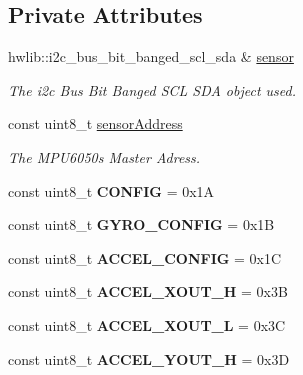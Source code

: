 \subsection*{Private Attributes}
\begin{DoxyCompactItemize}
\item 
\mbox{\label{classMpu6050_a03526c721c8d366b95d9c4cf9f19ef01}} 
hwlib\+::i2c\+\_\+bus\+\_\+bit\+\_\+banged\+\_\+scl\+\_\+sda \& \hyperlink{classMpu6050_a03526c721c8d366b95d9c4cf9f19ef01}{sensor}
\begin{DoxyCompactList}\small\item\em The i2c Bus Bit Banged S\+CL S\+DA object used. \end{DoxyCompactList}\item 
const uint8\+\_\+t \hyperlink{classMpu6050_ac95dd79bde2892d4a12778f1a436d004}{sensor\+Address}
\begin{DoxyCompactList}\small\item\em The M\+P\+U6050\textquotesingle{}s Master Adress. \end{DoxyCompactList}\item 
\mbox{\label{classMpu6050_a56864c427de5c7aef5e300c54a47bded}} 
const uint8\+\_\+t {\bfseries C\+O\+N\+F\+IG} = 0x1A
\item 
\mbox{\label{classMpu6050_a92283f30df1af2c91623a5f0333fed1b}} 
const uint8\+\_\+t {\bfseries G\+Y\+R\+O\+\_\+\+C\+O\+N\+F\+IG} = 0x1B
\item 
\mbox{\label{classMpu6050_ad91f1c822343ea98bcc82614192aaa91}} 
const uint8\+\_\+t {\bfseries A\+C\+C\+E\+L\+\_\+\+C\+O\+N\+F\+IG} = 0x1C
\item 
\mbox{\label{classMpu6050_a06c92ed9b73ae3cc0722f5bc6f938146}} 
const uint8\+\_\+t {\bfseries A\+C\+C\+E\+L\+\_\+\+X\+O\+U\+T\+\_\+H} = 0x3B
\item 
\mbox{\label{classMpu6050_ac3dbdb69cd713e2569fae19dedbc2191}} 
const uint8\+\_\+t {\bfseries A\+C\+C\+E\+L\+\_\+\+X\+O\+U\+T\+\_\+L} = 0x3C
\item 
\mbox{\label{classMpu6050_a3f10990055c9202de7ccc49a8875e2ca}} 
const uint8\+\_\+t {\bfseries A\+C\+C\+E\+L\+\_\+\+Y\+O\+U\+T\+\_\+H} = 0x3D

\end{DoxyCompactItemize}
